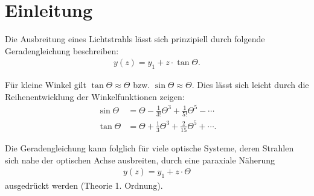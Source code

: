 \section{Einleitung}

Die Ausbreitung eines Lichtstrahls lässt sich prinzipiell durch folgende Geradengleichung beschreiben:
\begin{align*}
y(z)=y_1 + z \cdot \tan \Theta.
\end{align*}

Für kleine Winkel gilt $\tan\Theta \approx \Theta$ bzw. $\sin \Theta \approx \Theta $. Dies lässt sich leicht durch die Reihenentwicklung der Winkelfunktionen zeigen:
\begin{align*}
\sin \Theta &= \Theta - \frac{1}{3!}\Theta^3 + \frac{1}{5!}\Theta^5 - \cdots \\
\tan \Theta &= \Theta + \frac{1}{3}\Theta^3 + \frac{2}{15}\Theta^5 + \cdots.
\end{align*}

Die Geradengleichung kann folglich für viele optische Systeme, deren Strahlen sich nahe der optischen Achse ausbreiten, durch eine paraxiale Näherung 
\begin{align*}
y(z)=y_1 + z \cdot \Theta
\end{align*}
ausgedrückt werden (Theorie 1. Ordnung).

